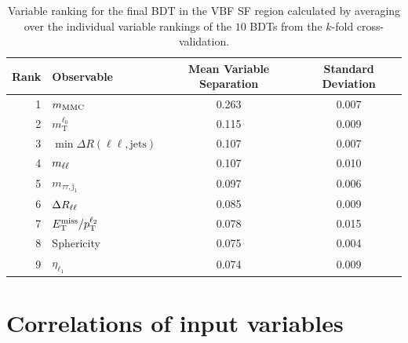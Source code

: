 \begin{table}[htpb]
    \centering
    \caption{Variable ranking for the final BDT in the VBF SF region calculated by averaging over the individual
             variable rankings of the $10$ BDTs from the $k$-fold cross-validation.}\label{tab:mva:variables:ranking:BOOSTSF}
    \begin{tabular}{rlcc}
        \toprule
        Rank & Observable & Mean Variable Separation & Standard Deviation \\ \midrule
        1 & $m_\text{MMC}$ & 0.263 & 0.007 \\
        2 & $m_\text{T}^{\ell_0}$ & 0.115 & 0.009 \\
        3 & $\min \Delta R (\ell\ell, \text{jets})$ & 0.107 & 0.007 \\
        4 & $m_{\ell\ell}$ & 0.107 & 0.010 \\
        5 & $m_{\tau\tau,\text{j}_1}$ & 0.097 & 0.006 \\
        6 & $\Delta R_{\ell\ell}$ & 0.085 & 0.009 \\
        7 & $E_\text{T}^\text{miss} / p_\text{T}^{\ell_2}$ & 0.078 & 0.015 \\
        8 & Sphericity & 0.075 & 0.004 \\
        9 & $\eta_{\ell_1}$ & 0.074 & 0.009 \\
        \bottomrule
    \end{tabular}
\end{table}

\section{Correlations of input variables}\label{app:mva:correlation_inputvars}

